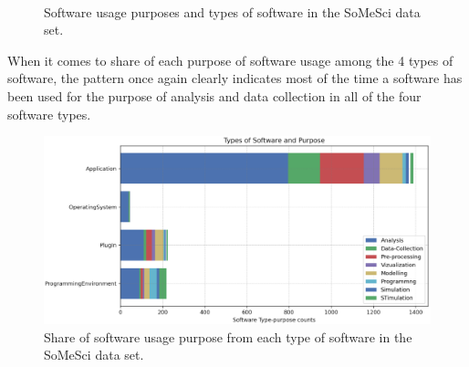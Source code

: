 \begin{figure}[h]
	\myfloatalign
	 \quad
	 \\
	\caption{Software usage purposes and types of software in the SoMeSci data set.}
	
\end{figure}


When it comes to share of each purpose of software usage among the 4 types of software, the pattern once again clearly indicates most of the time a software has been used for the purpose of analysis and data collection in all of the four software types. \\

\begin{figure}[htbp]
	\centering
	\includegraphics[width=1\textwidth]{4.graphics/figures/ch_4/analysisresults/6.Types of Software and Purpose stacked bar}
	\caption{Share of software usage purpose from each type of software in the \ac{SoMeSci} data set.}
	\label{fig:chapter03:setup}
\end{figure}

